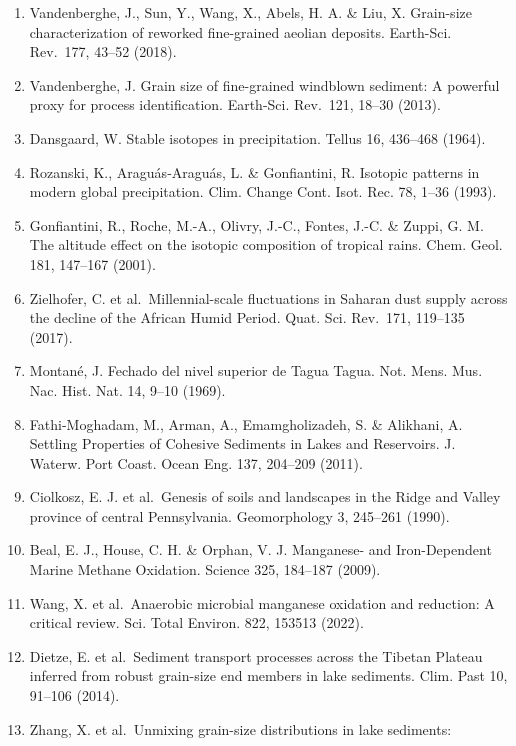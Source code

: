 \documentclass[
]{article}
\begin{document}
\begin{enumerate}
  in hydraulic and aeolian environments, and numerical partitioning of
  the sedimentary components. Sediment. Geol. 152, 263--277 (2002).
\item
  Vandenberghe, J., Sun, Y., Wang, X., Abels, H. A. \& Liu, X.
  Grain-size characterization of reworked fine-grained aeolian deposits.
  Earth-Sci. Rev.~177, 43--52 (2018).
\item
  Vandenberghe, J. Grain size of fine-grained windblown sediment: A
  powerful proxy for process identification. Earth-Sci. Rev.~121, 18--30
  (2013).
\item
  Dansgaard, W. Stable isotopes in precipitation. Tellus 16, 436--468
  (1964).
\item
  Rozanski, K., Araguás‐Araguás, L. \& Gonfiantini, R. Isotopic patterns
  in modern global precipitation. Clim. Change Cont. Isot. Rec. 78,
  1--36 (1993).
\item
  Gonfiantini, R., Roche, M.-A., Olivry, J.-C., Fontes, J.-C. \& Zuppi,
  G. M. The altitude effect on the isotopic composition of tropical
  rains. Chem. Geol. 181, 147--167 (2001).
\item
  Zielhofer, C. et al.~Millennial-scale fluctuations in Saharan dust
  supply across the decline of the African Humid Period. Quat. Sci.
  Rev.~171, 119--135 (2017).
\item
  Montané, J. Fechado del nivel superior de Tagua Tagua. Not. Mens. Mus.
  Nac. Hist. Nat. 14, 9--10 (1969).
\item
  Fathi-Moghadam, M., Arman, A., Emamgholizadeh, S. \& Alikhani, A.
  Settling Properties of Cohesive Sediments in Lakes and Reservoirs. J.
  Waterw. Port Coast. Ocean Eng. 137, 204--209 (2011).
\item
  Ciolkosz, E. J. et al.~Genesis of soils and landscapes in the Ridge
  and Valley province of central Pennsylvania. Geomorphology 3, 245--261
  (1990).
\item
  Beal, E. J., House, C. H. \& Orphan, V. J. Manganese- and
  Iron-Dependent Marine Methane Oxidation. Science 325, 184--187 (2009).
\item
  Wang, X. et al.~Anaerobic microbial manganese oxidation and reduction:
  A critical review. Sci. Total Environ. 822, 153513 (2022).
\item
  Dietze, E. et al.~Sediment transport processes across the Tibetan
  Plateau inferred from robust grain-size end members in lake sediments.
  Clim. Past 10, 91--106 (2014).
\item
  Zhang, X. et al.~Unmixing grain-size distributions in lake sediments:

\end{enumerate}
\end{document}

